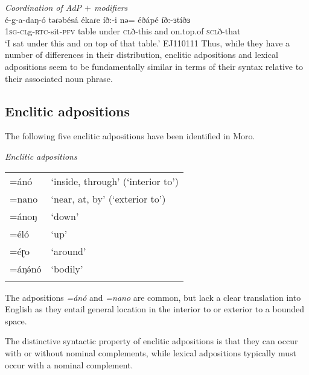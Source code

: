 \ea \textit{Coordination of AdP $+$ modifiers}\\
\gll	é-g-a-daŋ-ó   təɾəbésá  ékaɾe íð:-i  nə=  éðápé íð:-ɜtíðɜ\\
\textsc{1sg}-\textsc{cl}g-\textsc{rtc}-sit-\textsc{pfv} table under \textsc{cl}ð-this and on.top.of \textsc{scl}ð-that\\
\glt		`I sat under this and on top of that table.'
\hfill EJ110111
\z 
Thus, while they have a number of differences in their distribution, enclitic adpositions and lexical adpositions seem to be fundamentally similar in terms of their syntax relative to their associated noun phrase.

\subsection{Enclitic adpositions}\label{sec:ch13:enclitic}  

The following five enclitic adpositions have been identified in Moro. 

\ea	\textit{Enclitic adpositions}\\
	\begin{tabular}{ll}
	\lsptoprule
	{=ánó} & `inside, through' (`interior to')\\
	{=nano} & `near, at, by' (`exterior to')\\
	{=ánoŋ} & `down' \\
	{=éló} & `up' \\
	{=éɽo} & `around' \\
	{=áŋə́nó} & `bodily' \\
	\lspbottomrule
	\end{tabular}
\z 
The adpositions \textit{=ánó} and \textit{=nano} are common, but lack a clear translation into English as they entail general location in the interior to or exterior to a bounded space. 

The distinctive syntactic property of enclitic adpositions is that they can occur with or without nominal complements, while lexical adpositions typically must occur with a nominal complement.

